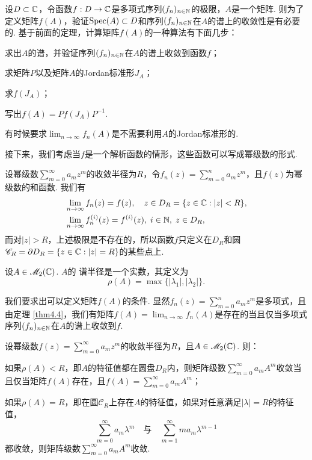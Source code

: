\begin{remark}
  设$D\subset \mathbb C$，令函数$f:D\to\mathbb C$是多项式序列$(f_n)_{n\in\mathbb N}$的极限，$A$是一个矩阵. 则为了定义矩阵$f(A)$，验证$\operatorname{Spec}(A)\subset D$和序列$(f_n)_{n\in\mathbb N}$在$A$的谱上的收敛性是有必要的. 基于前面的定理，计算矩阵$f(A)$的一种算法有下面几步：
  \begin{enum}
    \item 求出$A$的谱，并验证序列$(f_n)_{n\in\mathbb N}$在$A$的谱上收敛到函数$f$；
    \item 求矩阵$P$以及矩阵$A$的Jordan标准形$J_A$；
    \item 求$f(J_A)$；
    \item 写出$f(A)=Pf(J_A)P^{-1}$.
  \end{enum}
\end{remark}

有时候要求$\lim_{n\to\infty}f_n(A)$是不需要利用$A$的Jordan标准形的.

接下来，我们考虑当$f$是一个解析函数的情形，这些函数可以写成幂级数的形式.

设幂级数$\sum_{m=0}^\infty a_mz^m$的收敛半径为$R$，令$f_n(z)=\sum_{m=0}^na_mz^m$，且$f(z)$为幂级数的和函数. 我们有
\begin{equation}\label{eq4.1}
  \begin{aligned}
    & \lim_{n\to\infty}f_n(z) = f(z), \quad z\in D_R =
    \{ z\in \MC:|z| < R\}, \\
    & \lim_{n\to\infty}f_n^{(i)}(z) = f^{(i)}(z),\; i \in\MN,\;z\in D_R,
  \end{aligned}
\end{equation}
而对$|z|>R$，上述极限是不存在的，所以函数$f$只定义在$D_R$和圆$\mathscr C_R=\partial D_R=\{z\in\mathbb C:|z|=R\}$的某些点上.

\begin{mybox}
  \begin{definition}
    设$A\in\mathscr M_2(\mathbb C)$. $A$的 {\kaishu 谱半径}是一个实数，其定义为
    \[
      \rho(A) = \max\{|\lambda_1|,|\lambda_2|\}.
    \]
  \end{definition}
\end{mybox}

我们要求出可以定义矩阵$f(A)$的条件. 显然$f_n(z)=\sum_{m=0}^na_mz^m$是多项式，且由定理 \ref{thm4.4}，我们有矩阵$f(A)=\lim_{n\to\infty}f_n(A)$是存在的当且仅当多项式序列$(f_n)_{n\in\mathbb N}$在$A$的谱上收敛到$f$.
\begin{theorem}
  设幂级数$f(z)=\sum_{m=0}^\infty a_mz^m$的收敛半径为$R$，且$A\in\mathscr M_2(\mathbb C)$. 则：
  \begin{enum}
    \item 如果$\rho(A)<R$，即$A$的特征值都在圆盘$D_R$内，则矩阵级数$\sum_{m=0}^\infty a_mA^m$收敛当且仅当矩阵$f(A)$存在，且$f(A)=\sum_{m=0}^\infty a_mA^m$；
    \item 如果$\rho(A)=R$，即在圆$\mathscr C_R$上存在$A$的特征值，如果对任意满足$|\lambda|=R$的特征值，
        \begin{equation}\label{eq4.2}
          \sum_{m=0}^\infty a_m\lambda^m \quad
          \text{与}\quad \sum_{m=1}^\infty ma_m\lambda^{m-1}
        \end{equation}
        都收敛，则矩阵级数$\sum_{m=0}^\infty a_mA^m$收敛.
  \end{enum}
\end{theorem}


